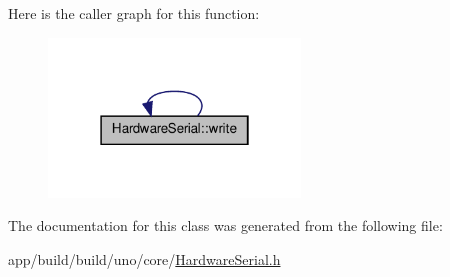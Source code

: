 Here is the caller graph for this function\-:
\nopagebreak
\begin{figure}[H]
\begin{center}
\leavevmode
\includegraphics[width=190pt]{class_hardware_serial_a4d67d5698c572032d98ad445d3b4f897_icgraph}
\end{center}
\end{figure}




The documentation for this class was generated from the following file\-:\begin{DoxyCompactItemize}
\item 
app/build/build/uno/core/\hyperlink{_hardware_serial_8h}{Hardware\-Serial.\-h}\end{DoxyCompactItemize}
